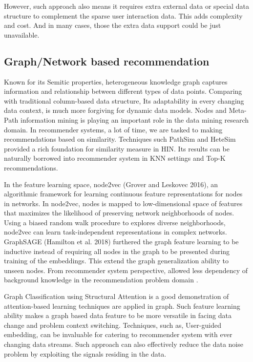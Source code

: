 However, such approach also means it requires extra external data or special data structure to complement the sparse user interaction data. This adds complexity and cost. And in many cases, those the extra data support could be just unavailable. 

\subsection{Graph/Network based recommendation}
Known for its Semitic properties, heterogeneous knowledge graph captures information and relationship between different types of data points. Comparing with traditional column-based data structure, Its adaptability in every changing data context, is much more forgiving for dynamic data models. Nodes and Meta-Path information mining is playing an important role in the data mining research domain. In recommender systems, a lot of time, we are tasked to making recommendations based on similarity. Techniques such PathSim \citep{Sun2011PathSim} and HeteSim \citep{Shi2013HeteSim} provided a rich foundation for similarity measure in HIN. Its results can be naturally borrowed into recommender system in KNN settings and Top-K recommendations. 

In the feature learning space, node2vec (Grover and Leskovec 2016), an algorithmic framework for learning continuous feature representations for nodes in networks. In node2vec, nodes is mapped to low-dimensional space of features that maximizes the likelihood of preserving network neighborhoods of nodes. Using a biased random walk procedure to explores diverse neighborhoods, node2vec can learn task-independent representations in complex networks. GraphSAGE (Hamilton et al. 2018) furthered the graph feature learning to be inductive instead of requiring all nodes in the graph to be presented during training of the embeddings. This extend the graph generalization ability to unseen nodes. From recommender system perspective, allowed less dependency of background knowledge in the recommendation problem domain \citep{Hu2018}.  

Graph Classification using Structural Attention \citep{lee2018graph} is a good demonstration of attention-based learning techniques are applied in graph. Such feature learning ability makes a graph based data feature to be more versatile in facing data change and problem context switching. 
Techniques, such as, User-guided embedding, can be invaluable for catering to recommender system with ever changing data streams. Such approach can also effectively reduce the data noise problem by exploiting the signals residing in the data.  

